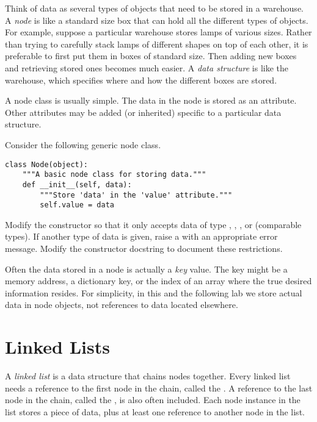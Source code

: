 Think of data as several types of objects that need to be stored in a warehouse.
A \emph{node} is like a standard size box that can hold all the different types of objects.
For example, suppose a particular warehouse stores lamps of various sizes.
Rather than trying to carefully stack lamps of different shapes on top of each other, it is preferable to first put them in boxes of standard size.
Then adding new boxes and retrieving stored ones becomes much easier.
A \emph{data structure} is like the warehouse, which specifies where and how the different boxes are stored.

A node class is usually simple.
The data in the node is stored as an attribute.
Other attributes may be added (or inherited) specific to a particular data structure.

\begin{problem} %
Consider the following generic node class.
\begin{lstlisting}
class Node(object):
    """A basic node class for storing data."""
    def __init__(self, data):
        """Store 'data' in the 'value' attribute."""
        self.value = data
\end{lstlisting}

Modify the constructor so that it only accepts data of type , , , or  (comparable types).
If another type of data is given, raise a  with an appropriate error message.
Modify the constructor docstring to document these restrictions.
\end{problem}

\begin{info}
Often the data stored in a node is actually a \emph{key} value.
The key might be a memory address, a dictionary key, or the index of an array where the true desired information resides.
For simplicity, in this and the following lab we store actual data in node objects, not references to data located elsewhere.
\end{info}

\section*{Linked Lists} %

A \emph{linked list} is a data structure that chains nodes together.
Every linked list needs a reference to the first node in the chain, called the .
A reference to the last node in the chain, called the , is also often included.
Each node instance in the list stores a piece of data, plus at least one reference to another node in the list.


